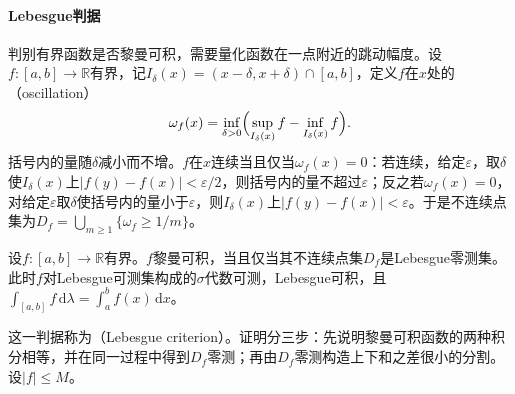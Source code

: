 \paragraph{Lebesgue判据}
判别有界函数是否黎曼可积，需要量化函数在一点附近的跳动幅度。设$f:[a,b]\to\mathbb R$有界，记$I_\delta(x)=(x-\delta,x+\delta)\cap[a,b]$，定义$f$在$x$处的（oscillation）
\[
 \omega_f(x)=\inf_{\delta>0}\Bigl(\sup_{I_\delta(x)}f-\inf_{I_\delta(x)}f\Bigr).
\]
括号内的量随$\delta$减小而不增。$f$在$x$连续当且仅当$\omega_f(x)=0$：若连续，给定$\varepsilon$，取$\delta$使$I_\delta(x)$上$|f(y)-f(x)|<\varepsilon/2$，则括号内的量不超过$\varepsilon$；反之若$\omega_f(x)=0$，对给定$\varepsilon$取$\delta$使括号内的量小于$\varepsilon$，则$I_\delta(x)$上$|f(y)-f(x)|<\varepsilon$。于是不连续点集为$D_f=\bigcup_{m\ge1}\{\omega_f\ge1/m\}$。

\begin{theorem}[黎曼可积的Lebesgue判据]
\label{thm:integral-riemann-lebesgue}
设$f:[a,b]\to\mathbb R$有界。$f$黎曼可积，当且仅当其不连续点集$D_f$是Lebesgue零测集。此时$f$对Lebesgue可测集构成的$\sigma$代数可测，Lebesgue可积，且$\int_{[a,b]}f\,\mathrm d\lambda=\int_a^bf(x)\,\mathrm dx$。
\end{theorem}

这一判据称为（Lebesgue criterion）。证明分三步：先说明黎曼可积函数的两种积分相等，并在同一过程中得到$D_f$零测；再由$D_f$零测构造上下和之差很小的分割。设$|f|\le M$。

